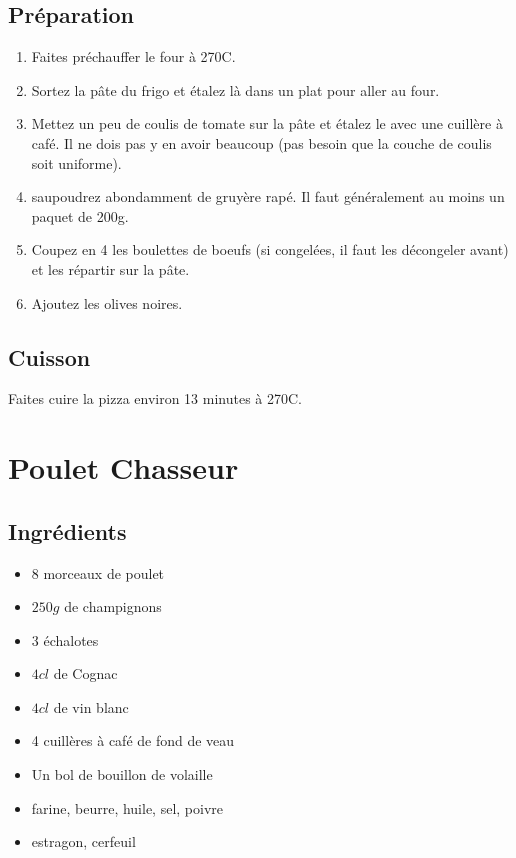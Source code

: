 \subsection*{Préparation}
\begin{enumerate}
\item Faites préchauffer le four à 270\degres C.
\item Sortez la pâte du frigo et étalez là dans un plat pour aller au four.
\item Mettez un peu de coulis de tomate sur la pâte et étalez le avec une cuillère à café. Il ne dois pas y en avoir beaucoup (pas besoin que la couche de coulis soit uniforme).
\item saupoudrez abondamment de gruyère rapé. Il faut généralement au moins un paquet de 200g.
\item Coupez en 4 les boulettes de boeufs (si congelées, il faut les décongeler avant) et les répartir sur la pâte.
\item Ajoutez les olives noires.
\end{enumerate}

\subsection*{Cuisson}
Faites cuire la pizza environ 13 minutes à 270\degres C.

\newpage
\section{Poulet Chasseur}
\subsection*{Ingrédients}
\begin{itemize}
\item 8 morceaux de poulet
\item $250\unit{g}$ de champignons
\item 3 échalotes
\item $4\unit{cl}$ de Cognac
\item $4\unit{cl}$ de vin blanc
\item 4 cuillères à café de fond de veau
\item Un bol de bouillon de volaille
\item farine, beurre, huile, sel, poivre
\item estragon, cerfeuil
\end{itemize}



